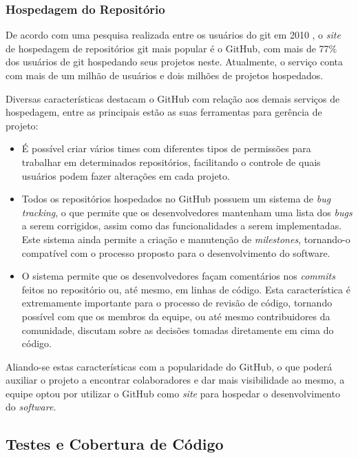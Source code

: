 \subsubsection{Hospedagem do Repositório}

De acordo com uma pesquisa realizada entre os usuários do git em 2010 \cite{gitus2010}, o \emph{site} de hospedagem de repositórios git mais popular é o GitHub, com mais de 77\% dos usuários de git hospedando seus projetos neste.
Atualmente, o serviço conta com mais de um milhão de usuários e dois milhões de projetos hospedados. %

Diversas características destacam o GitHub com relação aos demais serviços de hospedagem, entre as principais estão as suas ferramentas para gerência de projeto:

\begin{itemize}
	\item É possível criar vários times com diferentes tipos de permissões para trabalhar em determinados repositórios, facilitando o controle de quais usuários podem fazer alterações em cada projeto.
	\item Todos os repositórios hospedados no GitHub possuem um sistema de \emph{bug tracking}, o que permite que os desenvolvedores mantenham uma lista dos \emph{bugs} a serem corrigidos, assim como das funcionalidades a serem implementadas.
Este sistema ainda permite a criação e manutenção de \emph{milestones}, tornando-o compatível com o processo proposto para o desenvolvimento do software.
	\item O sistema permite que os desenvolvedores façam comentários nos \emph{commits} feitos no repositório ou, até mesmo, em linhas de código.
Esta característica é extremamente importante para o processo de revisão de código, tornando possível com que os membros da equipe, ou até mesmo contribuidores da comunidade, discutam sobre as decisões tomadas diretamente em cima do código.
\end{itemize}

Aliando-se estas características com a popularidade do GitHub, o que poderá auxiliar o projeto a encontrar colaboradores e dar mais visibilidade ao mesmo, a equipe optou por utilizar o GitHub como \emph{site} para hospedar o desenvolvimento do \emph{software}.



\subsection{Testes e Cobertura de Código}\label{met:Cobertura}


